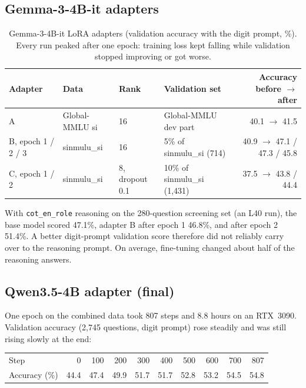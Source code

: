 \documentclass[10pt,a4paper]{article}
\newcommand{\cond}[1]{\texttt{#1}}
\begin{document}
\subsection{Gemma-3-4B-it adapters}
\begin{table}[h]
\centering\small
\begin{tabular}{llllr}
\toprule
Adapter & Data & Rank & Validation set & Accuracy before $\rightarrow$ after\\
\midrule
A & Global-MMLU si & 16 & Global-MMLU dev part & 40.1 $\rightarrow$ 41.5\\
B, epoch 1 / 2 / 3 & sinmulu\_si & 16 & 5\% of sinmulu\_si (714) & 40.9 $\rightarrow$ 47.1 / 47.3 / 45.8\\
C, epoch 1 / 2 & sinmulu\_si & 8, dropout 0.1 & 10\% of sinmulu\_si (1,431) & 37.5 $\rightarrow$ 43.8 / 44.4\\
\bottomrule
\end{tabular}
\caption{Gemma-3-4B-it LoRA adapters (validation accuracy with the digit prompt, \%). Every run peaked after one epoch:
training loss kept falling while validation stopped improving or got worse.}
\end{table}
With \cond{cot\_en\_role} reasoning on the 280-question screening set (an L40 run), the base model scored 47.1\%,
adapter B after epoch 1 46.8\%, and after epoch 2 51.4\%. A better digit-prompt validation score therefore did not
reliably carry over to the reasoning prompt. On average, fine-tuning changed about half of the reasoning answers.

\subsection{Qwen3.5-4B adapter (final)}
One epoch on the combined data took 807 steps and 8.8 hours on an RTX~3090. Validation accuracy (2,745 questions,
digit prompt) rose steadily and was still rising slowly at the end:

\begin{center}\small
\begin{tabular}{l*{9}{r}}
\toprule
Step & 0 & 100 & 200 & 300 & 400 & 500 & 600 & 700 & 807\\
Accuracy (\%) & 44.4 & 47.4 & 49.9 & 51.7 & 51.7 & 52.8 & 53.2 & 54.5 & 54.8\\
\bottomrule
\end{tabular}
\end{center}
\end{document}
